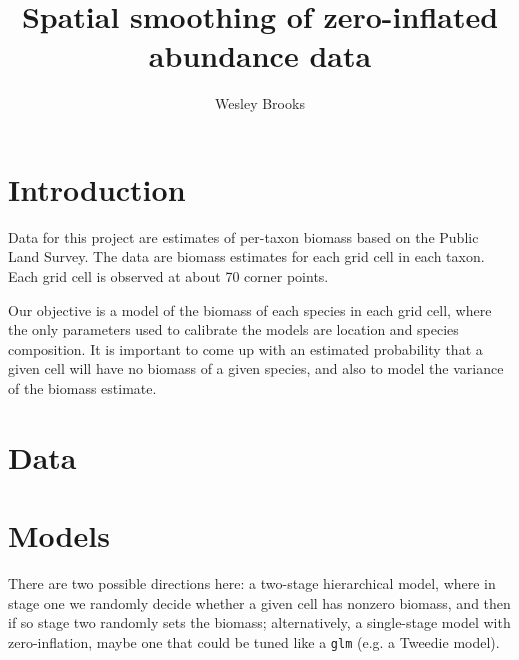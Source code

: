 \documentclass[authoryear, review, 11pt]{elsarticle}
\title{Spatial smoothing of zero-inflated abundance data}
\author{Wesley Brooks}
\begin{document}
\maketitle

\section{Introduction}
Data for this project are estimates of per-taxon biomass based on the Public Land Survey.  The data are biomass estimates for each grid cell in each taxon. Each grid cell is observed at about 70 corner points.


Our objective is a  model of the biomass of each species in each grid cell, where the only parameters used to calibrate the models are location and species composition. It is important to come up with an estimated probability that a given cell will have no biomass of a given species, and also to model the variance of the biomass estimate.\\


\section{Data}





\section{Models}
There are two possible directions here: a two-stage hierarchical model, where in stage one we randomly decide whether a given cell has nonzero biomass, and then if so stage two randomly sets the biomass; alternatively, a single-stage model with zero-inflation, maybe one that could be tuned like a \verb!glm! (e.g. a Tweedie model).\\
\end{document}
